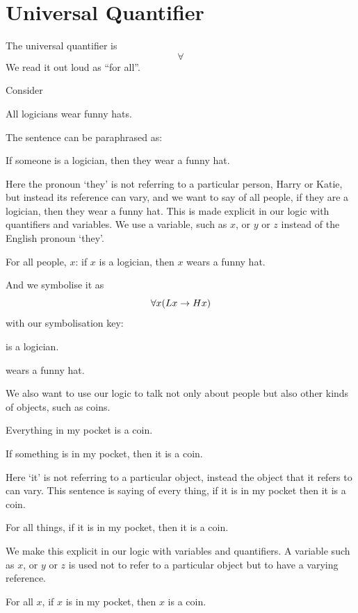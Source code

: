 \section{Universal Quantifier}

The universal quantifier is $$\forall$$ We read it out loud as ``for all''. 



Consider
\begin{samplesent}
	\item\label{sent:q:hat} All logicians wear funny hats. 
\end{samplesent}

The sentence can be paraphrased as:
\begin{samplesent}
	\item[]If someone is a logician, then they wear a funny hat. 
\end{samplesent}
Here the pronoun `they' is not referring to a particular person, Harry or Katie, but instead its reference can vary, and we want to say of all people, if they are a logician, then they wear a funny hat.
This is made explicit in our logic with quantifiers and variables. We use a variable, such as $x$, or $y$ or $z$ instead of the English pronoun `they'.
\begin{samplesent}
	\item\label{sent:q:hat3} For all people, $x$: if $x$ is a logician, then $x$ wears a funny hat. 
\end{samplesent}

And we symbolise it as $$\forall x(Lx\rightarrow Hx)$$ with our symbolisation key:
\begin{ekey}
	\item[Lx]  is a logician.
	\item[Hx]  wears a funny hat.
\end{ekey}


We also want to use our logic to talk not only about people but also other kinds of objects, such as coins. 
\begin{samplesent}
	\item\label{sent:q:hat} Everything in my pocket is a coin. 
\end{samplesent}
\begin{samplesent}
	\item[]\label{sent:q:hat2}  If something is in my pocket, then it is a coin. 
\end{samplesent}
Here `it' is not referring to a particular object, instead the object that it refers to can vary. This sentence is saying of every thing, if it is in my pocket then it is a coin. 
\begin{samplesent}
	\item[] For all things, if it is in my pocket, then it is a coin. 
\end{samplesent}
We make this explicit in our logic with variables and quantifiers. A variable such as $x$, or $y$ or $z$ is used not to refer to a particular object but to have a varying reference. 
\begin{samplesent}
	\item[] For all $x$, if $x$ is in my pocket, then $x$ is a coin. 
\end{samplesent}

